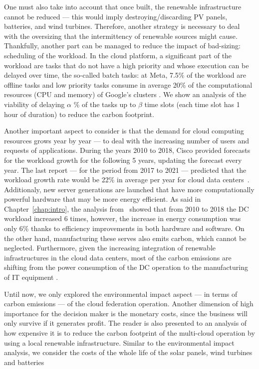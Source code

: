One must also take into account that once built, the renewable infrastructure cannot be reduced --- this would imply destroying/discarding PV panels, batteries, and wind turbines. Therefore, another strategy is necessary to deal with the oversizing that the intermittency of renewable sources might cause. Thankfully, another part can be managed to reduce the impact of bad-sizing: scheduling of the workload. In the cloud platform, a significant part of the workload are tasks that do not have a high priority and whose execution can be delayed over time, the so-called batch tasks: at Meta, 7.5\% of the workload are offline tasks \cite{acun2022holistic} and low priority tasks consume in average 20\% of the computational resources (CPU and memory) of Google's clusters \cite{googleborg_2020}. We show an analysis of the viability of delaying $\alpha$ \% of the tasks up to $\beta$ time slots (each time slot has 1 hour of duration) to reduce the carbon footprint.

Another important aspect to consider is that the demand for cloud computing resources grows year by year --- to deal with the increasing number of users and requests of applications. During the years 2010 to 2018, Cisco provided forecasts for the workload growth for the following 5 years, updating the forecast every year. The last report --- for the period from 2017 to 2021 --- predicted that the workload growth rate would be 22\% in average per year for cloud data centers~\cite{cisco_global_cloud_index_2018}.  Additionaly, new server generations are launched that have more computationally powerful hardware that may be more energy efficient. As said in Chapter~\ref{chap:intro},  the analysis from~\citet{masanet2020recalibrating} showed that from 2010 to 2018 the DC workload increased 6 times, however, the increase in energy consumption was only 6\% thanks to efficiency improvements in both hardware and software. On the other hand, manufacturing these serves also emits carbon, which cannot be neglected. Furthermore, given the increasing integration of renewable infrastructures in the cloud data centers, most of the carbon emissions are shifting from the power consumption of the DC operation to the manufacturing of IT equipment \cite{gupta2021_chasingcarbon}.

Until now, we only explored the environmental impact aspect --- in terms of carbon emissions --- of the cloud federation operation. Another dimension of high importance for the decision maker is the monetary costs, since the business will only survive if it generates profit. The reader is also presented to an analysis of how expensive it is to reduce the carbon footprint of the multi-cloud operation by using a local renewable infrastructure. Similar to the environmental impact analysis, we consider the costs of the whole life of the solar panels, wind turbines and batteries

